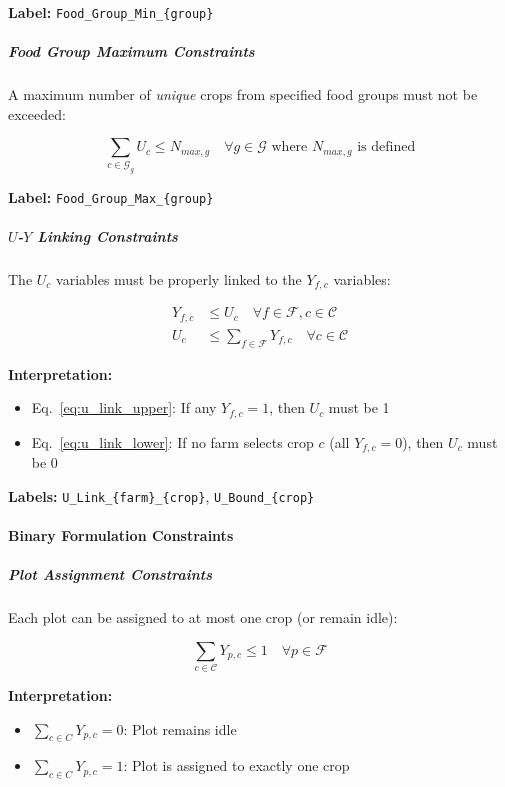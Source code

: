 \documentclass{oqireport}
\begin{document}
\textbf{Label:} \texttt{Food\_Group\_Min\_\{group\}}

\subparagraph{Food Group Maximum Constraints}

A maximum number of \textit{unique} crops from specified food groups must not be exceeded:

$$\sum_{c \in \mathcal{G}_g} U_c \leq N_{max,g} \quad \forall g \in \mathcal{G} \text{ where } N_{max,g} \text{ is defined}$$

\textbf{Label:} \texttt{Food\_Group\_Max\_\{group\}}

\subparagraph{$U$-$Y$ Linking Constraints}

The $U_c$ variables must be properly linked to the $Y_{f,c}$ variables:

\begin{align}
Y_{f,c} &\leq U_c \quad \forall f \in \mathcal{F}, c \in \mathcal{C} \label{eq:u_link_upper}\\
U_c &\leq \sum_{f \in \mathcal{F}} Y_{f,c} \quad \forall c \in \mathcal{C} \label{eq:u_link_lower}
\end{align}

\textbf{Interpretation:}
\begin{itemize}
    \item Eq.~\eqref{eq:u_link_upper}: If any $Y_{f,c} = 1$, then $U_c$ must be 1
    \item Eq.~\eqref{eq:u_link_lower}: If no farm selects crop $c$ (all $Y_{f,c} = 0$), then $U_c$ must be 0
\end{itemize}

\textbf{Labels:} \texttt{U\_Link\_\{farm\}\_\{crop\}}, \texttt{U\_Bound\_\{crop\}}

\paragraph{Binary Formulation Constraints}

\subparagraph{Plot Assignment Constraints}

Each plot can be assigned to at most one crop (or remain idle):

$$\sum_{c \in \mathcal{C}} Y_{p,c} \leq 1 \quad \forall p \in \mathcal{F}$$



\textbf{Interpretation:}
\begin{itemize}
    \item $\sum_{c \in C} Y_{p,c} = 0$: Plot remains idle
    \item $\sum_{c \in C} Y_{p,c} = 1$: Plot is assigned to exactly one crop
\end{itemize}
\end{document}
